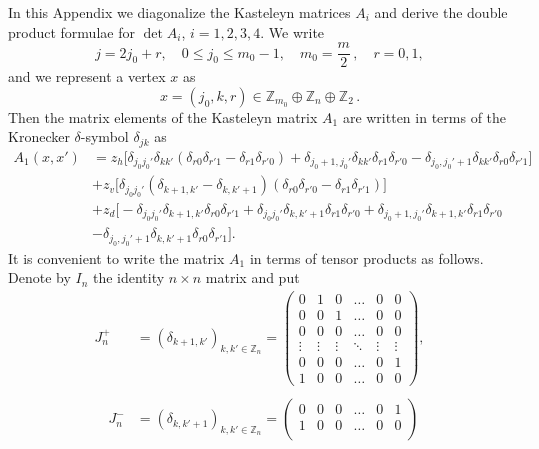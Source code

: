 \documentclass[12pt,reqno]{amsart}
\numberwithin{equation}{section}
\newcommand{\Z}{{\mathbb Z}}
\newcommand{\de}{\delta}
\begin{document}
\begin{appendix}
In this Appendix we diagonalize the Kasteleyn matrices $A_i$ and derive the
double product formulae for $\det A_i$, $i=1,2,3,4$.
We write 
\begin{equation}\label{km1}
j=2j_0+r, \quad 0\le j_0\le m_0-1,\quad  m_0=\frac{m}{2}\,,\quad r=0,1,
\end{equation}
and we represent a vertex $x$ as
\begin{equation}\label{km2}
x=(j_0,k,r)\in \Z_{m_0}\oplus \Z_n\oplus\Z_2\,.
\end{equation}
Then the matrix elements of the Kasteleyn matrix $A_1$ are written in terms of the Kronecker $\de$-symbol $\de_{jk}$ as
\begin{equation}\label{km3}
\begin{aligned}
A_1(x,x')&=z_h\big[\de_{j_0j_0'}\de_{kk'}(\de_{r0}\de_{r'1}-\de_{r1}\de_{r'0})
+\de_{j_0+1,j_0'}\de_{kk'}\de_{r1}\de_{r'0}
-\de_{j_0,j_0'+1}\de_{kk'}\de_{r0}\de_{r'1}\big]\\
&+z_v\big[\de_{j_0j_0'}(\de_{k+1,k'}-\de_{k,k'+1})(\de_{r0}\de_{r'0}-\de_{r1}\de_{r'1})\big]\\
&+z_d\big[-\de_{j_0j_0'}\de_{k+1,k'}\de_{r0}\de_{r'1}+\de_{j_0j_0'}\de_{k,k'+1}\de_{r1}\de_{r'0} 
+\de_{j_0+1,j_0'}\de_{k+1,k'}\de_{r1}\de_{r'0}\\
&-\de_{j_0,j_0'+1}\de_{k,k'+1}\de_{r0}\de_{r'1} \big].
\end{aligned}
\end{equation}
It is convenient to write the matrix $A_1$ in terms of tensor products as follows. Denote by $I_n$ 
the identity $n\times n$ matrix and put
\begin{equation}\label{km4}
\begin{aligned}
J_{n}^+&=(\de_{k+1,k'})_{k,k'\in\Z_n}
=\begin{pmatrix}
0 & 1 & 0 & \ldots & 0 & 0\\
0 & 0 & 1 & \ldots & 0 & 0\\
0 & 0 & 0 & \ldots & 0 & 0\\
\vdots & \vdots & \vdots & \ddots & \vdots  & \vdots \\
0 & 0 & 0 & \ldots & 0 & 1 \\
1 & 0 & 0 & \ldots & 0 & 0
\end{pmatrix},\\ & {}\\
\quad J_{n}^-&=(\de_{k,k'+1})_{k,k'\in\Z_n}
=\begin{pmatrix}
0 & 0 & 0 & \ldots & 0 & 1\\
1 & 0 & 0 & \ldots & 0 & 0\\

\end{pmatrix}
\end{aligned}
\end{equation}
\end{appendix}
\end{document}
